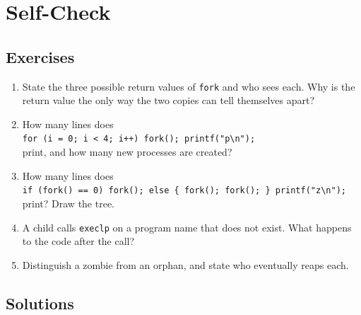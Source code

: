 \documentclass[11pt]{article}
\begin{document}
\section*{Self-Check}

\subsection*{Exercises}

\begin{enumerate}
  \item State the three possible return values of \texttt{fork} and who sees
        each. Why is the return value the only way the two copies can tell
        themselves apart?
  \item How many lines does
        \\\texttt{for (i = 0; i < 4; i++) fork(); printf("p\textbackslash n");}\\
        print, and how many new processes are created?
  \item How many lines does
        \\\texttt{if (fork() == 0) fork(); else \{ fork(); fork(); \}
        printf("z\textbackslash n");}\\ print? Draw the tree.
  \item A child calls \texttt{execlp} on a program name that does not exist.
        What happens to the code after the call?
  \item Distinguish a zombie from an orphan, and state who eventually reaps
        each.
\end{enumerate}

\subsection*{Solutions}
\end{document}
